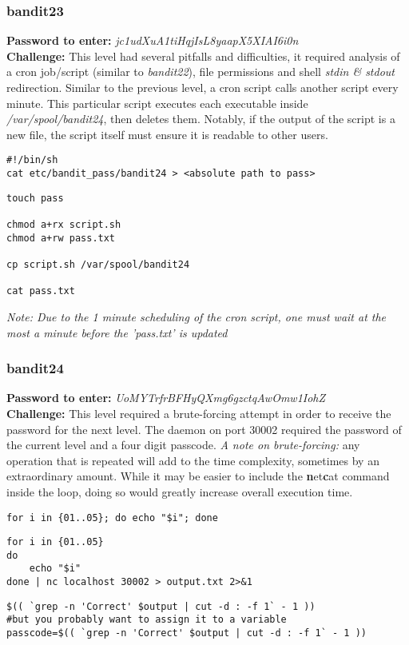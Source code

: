 \documentclass[a4paper]{article}
\newcommand{\pass}[1]{\textbf{Password to enter:} \textit{#1}\\}
\newcommand{\chall}{\textbf{Challenge:} }
\begin{document}
\subsubsection{bandit23}
\pass{jc1udXuA1tiHqjIsL8yaapX5XIAI6i0n}
\chall This level had several pitfalls and difficulties, it required analysis of a cron job/script (similar to \textit{bandit22}), file permissions and shell \textit{stdin \& stdout} redirection. Similar to the previous level, a cron script calls another script every minute. This particular script executes each executable inside \textit{/var/spool/bandit24}, then deletes them. Notably, if the output of the script is a new file, the script itself must ensure it is readable to other users.
\begin{lstlisting}[title=script.sh]
#!/bin/sh
cat etc/bandit_pass/bandit24 > <absolute path to pass>
\end{lstlisting}
\begin{lstlisting}
touch pass

chmod a+rx script.sh
chmod a+rw pass.txt

cp script.sh /var/spool/bandit24

cat pass.txt
\end{lstlisting}
\textit{Note: Due to the 1 minute scheduling of the cron script, one must wait at the most a minute before the 'pass.txt' is updated}

\subsubsection{bandit24}
\pass{UoMYTrfrBFHyQXmg6gzctqAwOmw1IohZ}
\chall This level required a brute-forcing attempt in order to receive the password for the next level. The daemon on port 30002 required the password of the current level and a four digit passcode.
\textit{A note on brute-forcing:} any operation that is repeated will add to the time complexity, sometimes by an extraordinary amount. While it may be easier to include the \textbf{n}et\textbf{c}at command inside the loop, doing so would greatly increase overall execution time.
\begin{lstlisting}[title=one line for loops in bash]
for i in {01..05}; do echo "$i"; done
\end{lstlisting}
\begin{lstlisting}[title=you can pipe the output of a for loop]
for i in {01..05}
do
	echo "$i"
done | nc localhost 30002 > output.txt 2>&1
\end{lstlisting}
\begin{lstlisting}[title=using grep line numbers combined with bash math]
$(( `grep -n 'Correct' $output | cut -d : -f 1` - 1 ))
#but you probably want to assign it to a variable
passcode=$(( `grep -n 'Correct' $output | cut -d : -f 1` - 1 ))
\end{lstlisting}
\end{document}
